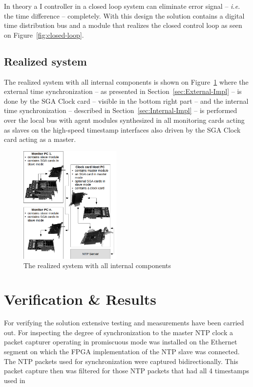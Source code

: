 \documentclass[article]{IEEEtran}
\begin{document}
In theory a I controller in a closed loop system can eliminate error signal -- \emph{i.e.} the time difference --
completely.
With this design the solution contains a digital time distribution bus and a module that realizes the
closed control loop as seen on Figure~\ref{fig:closed-loop}.

\subsection{Realized system}

The realized system with all internal components is shown on Figure~\ref{fig:realized-system} where the external time
synchronization -- as presented in Section~\ref{sec:External-Impl} -- is done by the SGA Clock card -- visible in the
bottom right part -- and the internal time synchronization -- described in Section~\ref{sec:Internal-Impl} --
is performed over the local bus with agent modules synthesized in all monitoring cards acting as slaves on the
high-speed timestamp interfaces also driven by the SGA Clock card acting as a master.

\begin{figure}[H]
    \centering
    \includegraphics[width=0.45\textwidth]{figures_raw/clock_architecture.png}
    \caption{The realized system with all internal components}
    \label{fig:realized-system}
\end{figure}

\section{Verification \& Results}


For verifying the solution extensive testing and measurements have been carried out. For inspecting the degree of
synchronization to the master NTP clock a packet capturer operating in promiscuous mode was installed on the Ethernet
segment on which the FPGA implementation of the NTP slave was connected. The NTP packets used for synchronization were
captured bidirectionally. This packet capture then was filtered for those NTP packets that had all 4 timestamps used in
\end{document}
